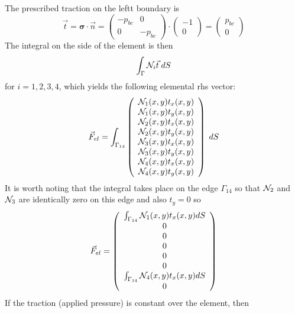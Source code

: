 The prescribed traction on the leftt boundary is
\[
{\vec t}={\bm \sigma}\cdot {\vec n}=
\left(
\begin{array}{cc}
-p_{bc} & 0 \\
0 & -p_{bc}
\end{array}
\right)
\cdot
\left(
\begin{array}{c}
-1 \\ 0
\end{array}
\right)
=
\left(
\begin{array}{c}
p_{bc} \\ 0
\end{array}
\right)
\]
The integral on the side of the element is then 
\[
\int_\Gamma {\mathcal{N}}_i {\vec t} \; dS
\]
for $i=1,2,3,4$, which yields the following elemental rhs vector:
\[
\vec{F}_{el}=
\int_{\Gamma_{14}} 
\left(
\begin{array}{c}
{\mathcal{N}}_1(x,y) t_x(x,y)\\
{\mathcal{N}}_1(x,y) t_y(x,y)\\
{\mathcal{N}}_2(x,y) t_x(x,y)\\
{\mathcal{N}}_2(x,y) t_y(x,y)\\
{\mathcal{N}}_3(x,y) t_x(x,y)\\
{\mathcal{N}}_3(x,y) t_y(x,y)\\
{\mathcal{N}}_4(x,y) t_x(x,y)\\
{\mathcal{N}}_4(x,y) t_y(x,y)
\end{array}
\right)
\; dS
\]
It is worth noting that the integral takes place on the edge $\Gamma_{14}$ 
so that ${\mathcal{N}}_2$ and ${\mathcal{N}}_3$ are identically zero on this edge
and also $t_y=0$ 
so 
\[
\vec{F}_{el}=
\left(
\begin{array}{c}
\int_{\Gamma_{14}}  {\mathcal{N}}_1(x,y) t_x(x,y) dS\\
0 \\
0 \\ 0 \\ 0 \\ 0 \\
\int_{\Gamma_{14}} {\mathcal{N}}_4(x,y) t_x(x,y) dS\\
0
\end{array}
\right)
\]
If the traction (applied pressure) is constant over the element, 
then  
